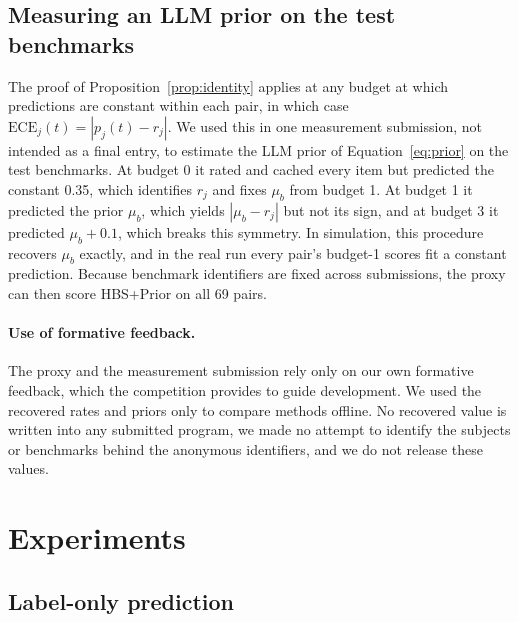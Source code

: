 \documentclass{article}
\newcommand{\ECE}{\mathrm{ECE}}
\begin{document}
\subsection{Measuring an LLM prior on the test benchmarks}
\label{sec:measure}

The proof of Proposition~\ref{prop:identity} applies at any budget at which predictions are constant within each pair, in which case $\ECE_j(t) = |p_j(t) - r_j|$. We used this in one measurement submission, not intended as a final entry, to estimate the LLM prior of Equation~\eqref{eq:prior} on the test benchmarks. At budget 0 it rated and cached every item but predicted the constant 0.35, which identifies $r_j$ and fixes $\mu_b$ from budget 1. At budget 1 it predicted the prior $\mu_b$, which yields $|\mu_b - r_j|$ but not its sign, and at budget 3 it predicted $\mu_b + 0.1$, which breaks this symmetry. In simulation, this procedure recovers $\mu_b$ exactly, and in the real run every pair's budget-1 scores fit a constant prediction. Because benchmark identifiers are fixed across submissions, the proxy can then score HBS+Prior on all 69 pairs.

\paragraph{Use of formative feedback.} The proxy and the measurement submission rely only on our own formative feedback, which the competition provides to guide development. We used the recovered rates and priors only to compare methods offline. No recovered value is written into any submitted program, we made no attempt to identify the subjects or benchmarks behind the anonymous identifiers, and we do not release these values.

\section{Experiments}
\label{sec:experiments}

\subsection{Label-only prediction}
\label{sec:labelonly}
\end{document}
